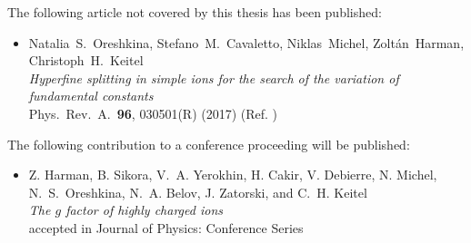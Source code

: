 \noindent
The following article not covered by this thesis has been published:

\begin{itemize}
\item Natalia~S.~Oreshkina, Stefano~M.~Cavaletto, Niklas~Michel, Zoltán~Harman,\\Christoph~H.~Keitel \\ 
\textit{Hyperfine splitting in simple ions for the search of the variation of fundamental constants} \\ 
Phys.~Rev.~A.~\textbf{96}, 030501(R) (2017) (Ref. \cite{oreshkina2017}) \vspace*{1pt} \\
\end{itemize} 

\noindent
The following contribution to a conference proceeding will be published:

\begin{itemize}
\item Z. Harman, B. Sikora, V.~A. Yerokhin, H. Cakir, V. Debierre, N. Michel, N.~S.~Oreshkina, N.~A. Belov, J. Zatorski, and C.~H. Keitel \\ 
\textit{The $g$ factor of highly charged ions} \\
accepted in Journal of Physics: Conference Series
\end{itemize} 

\thispagestyle{empty}
